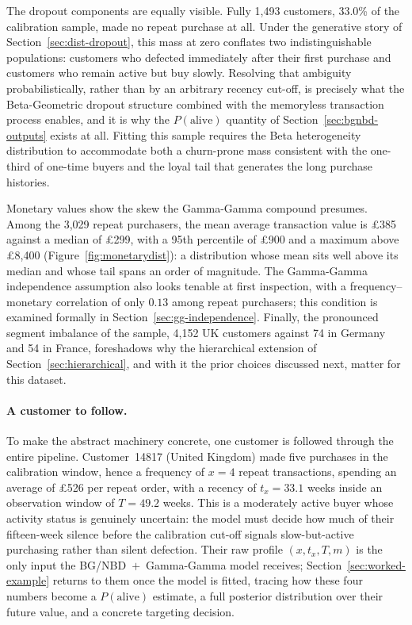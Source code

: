 \documentclass[12pt, a4paper, oneside]{report}
\begin{document}
The dropout components are equally visible. Fully 1,493 customers, 33.0\% of the calibration sample, made no repeat purchase at all. Under the generative story of Section~\ref{sec:dist-dropout}, this mass at zero conflates two indistinguishable populations: customers who defected immediately after their first purchase and customers who remain active but buy slowly. Resolving that ambiguity probabilistically, rather than by an arbitrary recency cut-off, is precisely what the Beta-Geometric dropout structure combined with the memoryless transaction process enables, and it is why the $P(\text{alive})$ quantity of Section~\ref{sec:bgnbd-outputs} exists at all. Fitting this sample requires the Beta heterogeneity distribution to accommodate both a churn-prone mass consistent with the one-third of one-time buyers and the loyal tail that generates the long purchase histories.

Monetary values show the skew the Gamma-Gamma compound presumes. Among the 3,029 repeat purchasers, the mean average transaction value is \pounds 385 against a median of \pounds 299, with a 95th percentile of \pounds 900 and a maximum above \pounds 8,400 (Figure~\ref{fig:monetarydist}): a distribution whose mean sits well above its median and whose tail spans an order of magnitude. The Gamma-Gamma independence assumption also looks tenable at first inspection, with a frequency--monetary correlation of only $0.13$ among repeat purchasers; this condition is examined formally in Section~\ref{sec:gg-independence}. Finally, the pronounced segment imbalance of the sample, 4,152 UK customers against 74 in Germany and 54 in France, foreshadows why the hierarchical extension of Section~\ref{sec:hierarchical}, and with it the prior choices discussed next, matter for this dataset.

\paragraph{A customer to follow.}
To make the abstract machinery concrete, one customer is followed through the entire pipeline. Customer~14817 (United Kingdom) made five purchases in the calibration window, hence a frequency of $x = 4$ repeat transactions, spending an average of \pounds 526 per repeat order, with a recency of $t_x = 33.1$ weeks inside an observation window of $T = 49.2$ weeks. This is a moderately active buyer whose activity status is genuinely uncertain: the model must decide how much of their fifteen-week silence before the calibration cut-off signals slow-but-active purchasing rather than silent defection. Their raw profile $(x, t_x, T, m)$ is the only input the BG/NBD~$+$~Gamma-Gamma model receives; Section~\ref{sec:worked-example} returns to them once the model is fitted, tracing how these four numbers become a $P(\text{alive})$ estimate, a full posterior distribution over their future value, and a concrete targeting decision.
\end{document}

